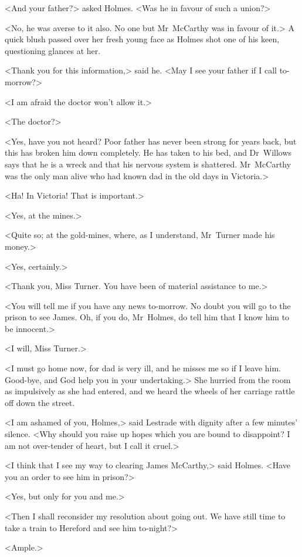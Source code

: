 <And your father?> asked Holmes. <Was he in favour of such a union?>

<No, he was averse to it also. No one but Mr~McCarthy was in favour of it.> A quick blush passed over her fresh young face as Holmes shot one of his keen, questioning glances at her.

<Thank you for this information,> said he. <May I see your father if I call to-morrow?>

<I am afraid the doctor won't allow it.>

<The doctor?>

<Yes, have you not heard? Poor father has never been strong for years back, but this has broken him down completely. He has taken to his bed, and Dr~Willows says that he is a wreck and that his nervous system is shattered. Mr~McCarthy was the only man alive who had known dad in the old days in Victoria.>

<Ha! In Victoria! That is important.>

<Yes, at the mines.>

<Quite so; at the gold-mines, where, as I understand, Mr~Turner made his money.>

<Yes, certainly.>

<Thank you, Miss Turner. You have been of material assistance to me.>

<You will tell me if you have any news to-morrow. No doubt you will go to the prison to see James. Oh, if you do, Mr~Holmes, do tell him that I know him to be innocent.>

<I will, Miss Turner.>

<I must go home now, for dad is very ill, and he misses me so if I leave him. Good-bye, and God help you in your undertaking.> She hurried from the room as impulsively as she had entered, and we heard the wheels of her carriage rattle off down the street.

<I am ashamed of you, Holmes,> said Lestrade with dignity after a few minutes' silence. <Why should you raise up hopes which you are bound to disappoint? I am not over-tender of heart, but I call it cruel.>

<I think that I see my way to clearing James McCarthy,> said Holmes. <Have you an order to see him in prison?>

<Yes, but only for you and me.>

<Then I shall reconsider my resolution about going out. We have still time to take a train to Hereford and see him to-night?>

<Ample.>

